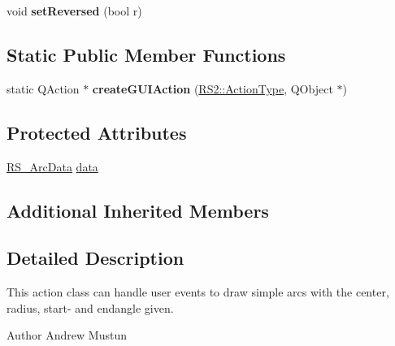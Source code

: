 \begin{DoxyCompactItemize}
\item 
\hypertarget{classRS__ActionDrawArc_aab8cc5daee063fcdf52965afcc9b950c}{void {\bfseries set\-Reversed} (bool r)}\label{classRS__ActionDrawArc_aab8cc5daee063fcdf52965afcc9b950c}

\end{DoxyCompactItemize}
\subsection*{Static Public Member Functions}
\begin{DoxyCompactItemize}
\item 
\hypertarget{classRS__ActionDrawArc_a34472f706fab9d7cae5d51a4984cba99}{static Q\-Action $\ast$ {\bfseries create\-G\-U\-I\-Action} (\hyperlink{classRS2_afe3523e0bc41fd637b892321cfc4b9d7}{R\-S2\-::\-Action\-Type}, Q\-Object $\ast$)}\label{classRS__ActionDrawArc_a34472f706fab9d7cae5d51a4984cba99}

\end{DoxyCompactItemize}
\subsection*{Protected Attributes}
\begin{DoxyCompactItemize}
\item 
\hyperlink{classRS__ArcData}{R\-S\-\_\-\-Arc\-Data} \hyperlink{classRS__ActionDrawArc_a8080d3fff21d9a47de9e47f904c9328d}{data}
\end{DoxyCompactItemize}
\subsection*{Additional Inherited Members}


\subsection{Detailed Description}
This action class can handle user events to draw simple arcs with the center, radius, start-\/ and endangle given.

\begin{DoxyAuthor}{Author}
Andrew Mustun 
\end{DoxyAuthor}


